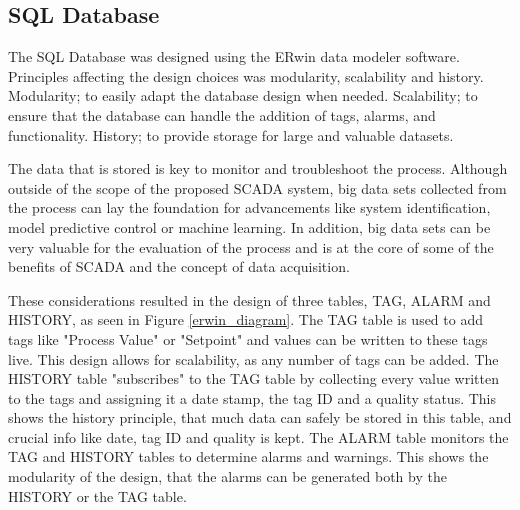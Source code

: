 \documentclass[conference]{IEEEtran}
\begin{document}
\subsection{SQL Database}
The SQL Database was designed using the ERwin data modeler software. Principles affecting the design choices was modularity, scalability and history. Modularity; to easily adapt the database design when needed. Scalability; to ensure that the database can handle the addition of tags, alarms, and functionality. History; to provide storage for large and valuable datasets.

The data that is stored is key to monitor and troubleshoot the process. Although outside of the scope of the proposed SCADA system, big data sets collected from the process can lay the foundation for advancements like system identification, model predictive control or machine learning. In addition, big data sets can be very valuable for the evaluation of the process and is at the core of some of the benefits of SCADA and the concept of data acquisition.

These considerations resulted in the design of three tables, TAG, ALARM and HISTORY, as seen in Figure \ref{erwin_diagram}. The TAG table is used to add tags like "Process Value" or "Setpoint" and values can be written to these tags live. This design allows for scalability, as any number of tags can be added. The HISTORY table "subscribes" to the TAG table by collecting every value written to the tags and assigning it a date stamp, the tag ID and a quality status. This shows the history principle, that much data can safely be stored in this table, and crucial info like date, tag ID and quality is kept. The ALARM table monitors the TAG and HISTORY tables to determine alarms and warnings. This shows the modularity of the design, that the alarms can be generated both by the HISTORY or the TAG table.
\end{document}
